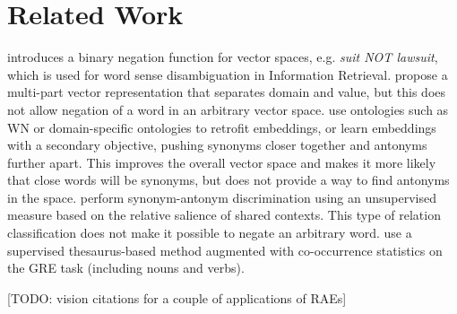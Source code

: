 \documentclass[11pt]{article}
\begin{document}
\section{Related Work}

\citet{widdows:03} introduces a binary negation function for vector
spaces, e.g. {\it suit NOT lawsuit}, which is used for word sense
disambiguation in Information Retrieval. \citet{turney:12,hermann:13}
propose a multi-part vector representation that separates domain and
value, but this does not allow negation of a word in an arbitrary
vector space. \citet{pham:15,nguyen:16,mrksic:16} use ontologies such
as WN or domain-specific ontologies to retrofit embeddings, or learn
embeddings with a secondary objective, pushing synonyms closer
together and antonyms further apart. This improves the overall vector
space and makes it more likely that close words will be synonyms, but
does not provide a way to find antonyms in the
space. \citet{santus:14a,santus:14b,santus:15} perform synonym-antonym
discrimination using an unsupervised measure based on the relative
salience of shared contexts. This type of relation classification does
not make it possible to negate an arbitrary word. \citet{mohammad:13} use a supervised
thesaurus-based method augmented with co-occurrence statistics on the
GRE task (including nouns and verbs). 

[TODO: vision citations for a couple of applications of RAEs]

\end{document}
